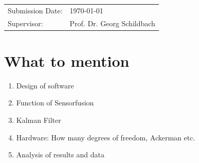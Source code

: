 \documentclass{article}
\begin{document}
\begin{tabular}{ll}
  Submission Date:  & \today \\
  Supervisor: & Prof. Dr. Georg Schildbach \\
\end{tabular}

\newpage

\thispagestyle{empty}

\renewcommand{\baselinestretch}{1.00}\normalsize

\setcounter{page}{1}
\renewcommand{\baselinestretch}{1}\normalsize

\newpage
\setcounter{page}{1}

\section*{What to mention}
\begin{enumerate}
  \item Design of software
  \item Function of Sensorfusion
  \item Kalman Filter
  \item Hardware: How many degrees of freedom, Ackerman etc.
  \item Analysis of results and data
\end{enumerate}
\end{document}
